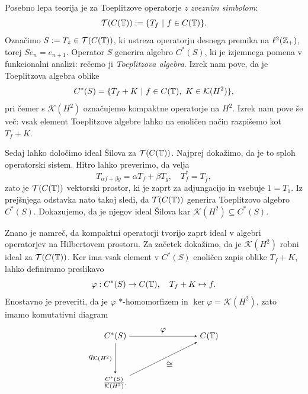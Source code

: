 \begin{zgled}
    Posebno lepa teorija je za Toeplitzove operatorje \emph{z zveznim simbolom}:
    $$\mathcal{T}(C(\mathbb T)) := \{T_f\ |\ f \in C(\mathbb T)\}.$$
    Označimo $S := T_z \in \mathcal{T} (C(\mathbb T))$, ki ustreza operatorju desnega premika na $\ell^2 (\mathbb Z_+)$,
    torej $S e_n = e_{n + 1}.$ Operator $S$ generira algebro $C^*(S)$, ki je izjemnega pomena v funkcionalni analizi: rečemo ji \emph{Toeplitzova algebra}. 
    Izrek \cite[Theorem 4.3.2, str. 111]{arveson2002} nam pove, da je Toeplitzova algebra oblike 
    $$C^*(S) = \{T_f + K\ |\ f \in C(\mathbb T),\ {K \in \mathcal{K}(H^2)}\},$$
    pri čemer s $\mathcal{K}(H^2)$ označujemo kompaktne operatorje na $H^2$.
    Izrek nam pove še več: vsak element Toeplitzove algebre lahko na enoličen način razpišemo kot $T_f + K$.

    Sedaj lahko določimo ideal Šilova za $\mathcal{T}(C(\mathbb T))$. Najprej dokažimo,
    da je to sploh operatorski sistem. Hitro lahko preverimo, da velja 
    $$T_{\alpha f + \beta g} = \alpha T_f + \beta T_g,\quad T_{f} ^* = T_{\overline{f}},$$
    zato je $\mathcal{T}(C(\mathbb T))$ vektorski prostor, ki je zaprt za adjungacijo in vsebuje $1 = T_1.$
    Iz prejšnjega odstavka nato takoj sledi, da $\mathcal{T}(C(\mathbb T))$ generira Toeplitzovo algebro $C^*(S)$.
    Dokazujemo, da je njegov ideal Šilova kar $\mathcal{K}(H^2) \subseteq C^*(S)$.
    
    Znano je namreč, da kompaktni operatorji tvorijo zaprt ideal v algebri operatorjev na Hilbertovem prostoru.
    Za začetek dokažimo, da je $\mathcal{K}({H^2})$ robni ideal za $\mathcal{T}(C(\mathbb T))$.
    Ker ima vsak element v $C^*(S)$ enoličen zapis oblike $T_f + K$, lahko definiramo preslikavo
    $$\varphi: C^*(S) \to C(\mathbb T),\quad T_f + K \mapsto f.$$
    Enostavno je preveriti, da je $\varphi$ $*$-homomorfizem in $\ker \varphi = \mathcal{K}(H^2)$, zato imamo komutativni diagram  
    \begin{equation*}
        \begin{tikzpicture}[>=stealth, node distance=3cm]
    
            \node (S) at (0,2) {$C^*(S)$};
            \node (A) at (4,2) {$C(\T)$};
            \node (Q) at (0,0) {$\frac{C^*({S})}{\mathcal{K}(H^2)}$.};
            
            \draw[->]  (S) -- node[above] {$\varphi$} (A);
            
            \draw[->] (S) -- node[left] {$q_{\mathcal{K}(H^2)}$} (Q);
            
            \draw[->] (Q) -- node[below right] {$\cong $} (A);
            

\end{tikzpicture}
\end{equation*}
\end{zgled}
